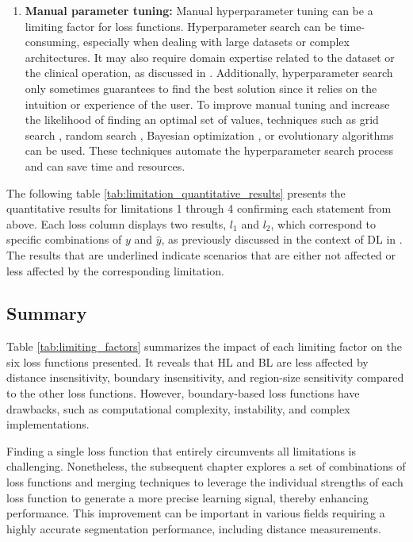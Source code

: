 \begin{enumerate}
  \item \textbf{Manual parameter tuning:} Manual hyperparameter tuning can be a limiting factor for loss functions. Hyperparameter search can be time-consuming, especially when dealing with large datasets or complex architectures. It may also require domain expertise related to the dataset or the clinical operation, as discussed in . Additionally, hyperparameter search only sometimes guarantees to find the best solution since it relies on the intuition or experience of the user. To improve manual tuning and increase the likelihood of finding an optimal set of values, techniques such as grid search \cite{9504761}, random search \cite{10.5555/2188385.2188395}, Bayesian optimization \cite{WU201926}, or evolutionary algorithms \cite{DBLP:journals/corr/abs-2105-09821} can be used. These techniques automate the hyperparameter search process and can save time and resources.
\end{enumerate}
The following table \ref{tab:limitation_quantitative_results} presents the quantitative results for limitations 1 through 4 confirming each statement from above. Each loss column displays two results, $l_1$ and $l_2$, which correspond to specific combinations of $y$ and $\hat{y}$, as previously discussed in the context of \acf{DL} in . The results that are underlined indicate scenarios that are either not affected or less affected by the corresponding limitation.



\subsection{Summary}
Table \ref{tab:limiting_factors} summarizes the impact of each limiting factor on the six loss functions presented. It reveals that \ac{HL} and \ac{BL} are less affected by distance insensitivity, boundary insensitivity, and region-size sensitivity compared to the other loss functions. However, boundary-based loss functions have drawbacks, such as computational complexity, instability, and complex implementations.

Finding a single loss function that entirely circumvents all limitations is challenging. Nonetheless, the subsequent chapter explores a set of combinations of loss functions and merging techniques to leverage the individual strengths of each loss function to generate a more precise learning signal, thereby enhancing performance. This improvement can be important in various fields requiring a highly accurate segmentation performance, including distance measurements.

